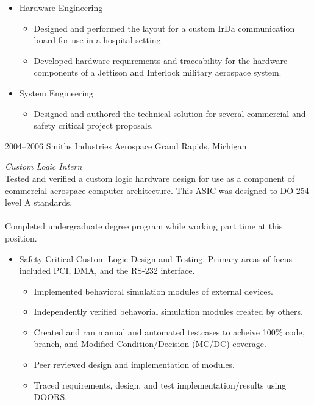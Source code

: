 \documentclass[print]{template/friggeri-cv} %
\begin{document}
\begin{entrylist}
{\begin{itemize}
\begin{itemize}
\begin{itemize}
\end{itemize}
\end{itemize}
\item Hardware Engineering
\begin{itemize}
\item Designed and performed the layout for a custom IrDa communication board for use in a hospital setting.
\item Developed hardware requirements and traceability for the hardware components of a Jettison and Interlock military aerospace system.
\end{itemize}
\item System Engineering
\begin{itemize}
\item Designed and authored the technical solution for several commercial and safety critical project proposals.
\end{itemize}
\end{itemize}}

\end{entrylist}

\begin{entrylist}

\longentry
{2004--2006}
{Smiths Industries Aerospace}
{Grand Rapids, Michigan}
{\emph{Custom Logic Intern} \\
Tested and verified a custom logic hardware design for use as a component of commercial aerospace computer architecture.  This ASIC was designed to DO-254 level A standards.  
\\
\\
Completed undergraduate degree program while working part time at this position.
\begin{itemize}
\item Safety Critical Custom Logic Design and Testing.  Primary areas of focus included PCI, DMA, and the RS-232 interface.
\begin{itemize}
\item Implemented behavioral simulation modules of external devices.
\item Independently verified behavorial simulation modules created by others.
\item Created and ran manual and automated testcases to acheive 100\% code, branch, and Modified Condition/Decision (MC/DC) coverage.
\item Peer reviewed design and implementation of modules.
\item Traced requirements, design, and test implementation/results using DOORS.
\end{itemize}
\end{itemize}}

\end{entrylist}
\end{document}
